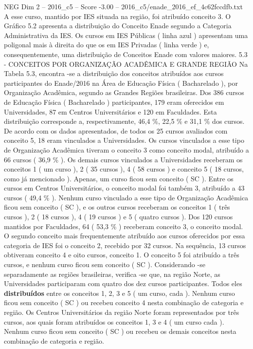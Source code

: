 \begin{textsample}{NEG Dim 2 – 2016\_c5 – Score -3.00 – 2016\_c5/enade\_2016\_ef\_4c62fccdfb.txt}
A esse curso, mantido por IES situada na região, foi atribuído conceito 3.
O Gráfico 5.2 apresenta a distribuição do Conceito Enade segundo a Categoria Administrativa da IES.
Os cursos em IES Públicas ( linha azul ) apresentam uma poligonal mais à direita do que os em IES Privadas ( linha verde ) e, consequentemente, uma distribuição de Conceitos Enade com valores maiores. 5.3 - CONCEITOS POR ORGANIZAÇÃO ACADÊMICA E GRANDE REGIÃO Na Tabela 5.3, encontra -se a distribuição dos conceitos atribuídos aos cursos participantes do Enade/2016 na Área de Educação Física ( Bacharelado ), por Organização Acadêmica, segundo as Grandes Regiões brasileiras.
Dos 386 cursos de Educação Física ( Bacharelado ) participantes, 179 eram oferecidos em Universidades, 87 em Centros Universitários e 120 em Faculdades.
Esta distribuição corresponde a, respectivamente, 46,4 \%, 22,5 \% e 31,1 \% dos cursos.
De acordo com os dados apresentados, de todos os 25 cursos avaliados com conceito 5, 18 eram vinculados a Universidades.
Os cursos vinculados a esse tipo de Organização Acadêmica tiveram o conceito 3 como conceito modal, atribuído a 66 cursos ( 36,9 \% ).
Os demais cursos vinculados a Universidades receberam os conceitos 1 ( um curso ), 2 ( 35 cursos ), 4 ( 58 cursos ) e conceito 5 ( 18 cursos, como já mencionado ).
Apenas, um curso ficou sem conceito ( SC ).
Entre os cursos em Centros Universitários, o conceito modal foi também 3, atribuído a 43 cursos ( 49,4 \% ).
Nenhum curso vinculado a esse tipo de Organização Acadêmica ficou sem conceito ( SC ), e os outros cursos receberam os conceitos 1 ( três cursos ), 2 ( 18 cursos ), 4 ( 19 cursos ) e 5 ( quatro cursos ).
Dos 120 cursos mantidos por Faculdades, 64 ( 53,3 \% ) receberam conceito 3, o conceito modal.
O segundo conceito mais frequentemente atribuído aos cursos oferecidos por essa categoria de IES foi o conceito 2, recebido por 32 cursos.
Na sequência, 13 cursos obtiveram conceito 4 e oito cursos, conceito 1.
O conceito 5 foi atribuído a três cursos, e nenhum curso ficou sem conceito ( SC ).
Considerando -se separadamente as regiões brasileiras, verifica -se que, na região Norte, as Universidades participaram com quatro dos dez cursos participantes.
Todos eles \textbf{distribuídos} entre os conceitos 1, 2, 3 e 5 ( um curso, cada ).
Nenhum curso ficou sem conceito ( SC ) ou recebeu conceito 4 nesta combinação de categoria e região.
Os Centros Universitários da região Norte foram representados por três cursos, aos quais foram atribuídos os conceitos 1, 3 e 4 ( um curso cada ).
Nenhum curso ficou sem conceito ( SC ) ou recebeu os demais conceitos nesta combinação de categoria e região.

\end{textsample}
